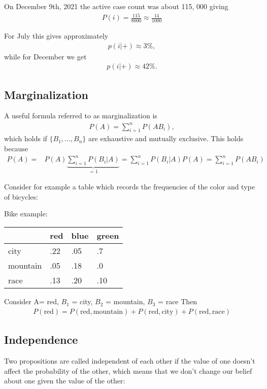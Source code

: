 On December 9th, 2021 the active case count was about 115, 000 giving
\begin{align}
  P(i)=\frac{115}{8000} \approx \frac{14}{1000}
\end{align}

For July this gives approximately
\begin{align}
  p(i|+) \approx 3\%,  
\end{align}
while for December we get 
\begin{align}
  p(i|+) \approx 42\%.
\end{align}


\subsection{Marginalization}
A useful formula referred to as marginalization is 
\begin{align}
  P(A) = \sum_{i=1}^{n}P(AB_{i}), 
\end{align}
which holds if $\{B_{1},\hdots ,B_{n}\}$ are exhaustive and mutually exclusive.
This holds because 
\begin{align}
  P(A) =& P(A) \underbrace{\sum_{i=1}^{n}P(B_{i}|A)}_{=1} = \sum_{i=1}^{n}P(B_{i}|A)P(A) = \sum_{i=1}^{n}P(AB_{i})
\end{align}

Consider for example a table which records the frequencies of the color and type of bicycles:

Bike example:\\
\begin{center}
\begin{tabular}{llll}
    & red & blue & green \\
    \hline
    city & .22 & .05 & .7 \\
    mountain & .05 & .18 & .0 \\
    race & .13 & .20 & .10 \\
\end{tabular}  
\end{center}

Consider A= red, $B_{1}$ = city, $B_{2}$ = mountain, $B_{3}$ = race Then
\begin{align}
  P(\text{red}) = P(\text{red}, \text{mountain}) + P(\text{red}, \text{city}) + P(\text{red},\text{race})  
\end{align}

\subsection{Independence}
Two propositions are called independent of each other 
if the value of one doesn't affect the probability of the other, which means that we don't 
change our belief about one given the value of the other:

